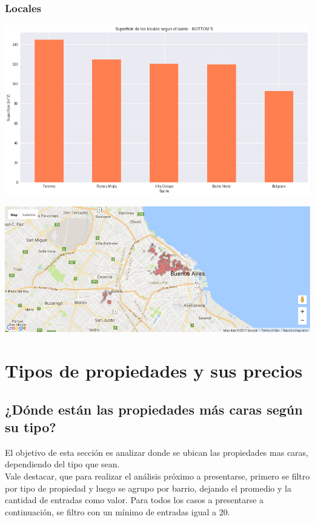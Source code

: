 \documentclass[a4paper, 10pt]{article}
\begin{document}
				\subsubsection{Locales}
					\begin{center}
   		    				\includegraphics[width=\textwidth]{images/storeSurfaceBottomBar}
				  	\end{center}
				  	\begin{center}
   		    				\includegraphics[width=\textwidth]{images/storeSurfaceBottomMap}
				  	\end{center}
		\section{Tipos de propiedades y sus precios}
			\subsection{¿Dónde están las propiedades más caras según su tipo?}
				El objetivo de esta sección es analizar donde se ubican las propiedades mas caras, dependiendo del tipo que sean. \\
				Vale destacar, que para realizar el análisis próximo a presentarse, primero se filtro por tipo de propiedad y luego se agrupo por barrio, dejando el promedio y la cantidad de entradas como valor. Para todos los casos a presentarse a continuación, se filtro con un mínimo de entradas igual a 20.
				 			
\end{document}
